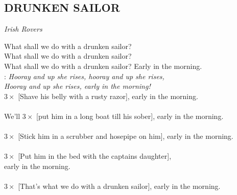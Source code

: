 \begin{flushleft}
	\section*{\Huge DRUNKEN SAILOR}
	\emph{Irish Rovers}
\end{flushleft}

What shall we do with a drunken sailor?\\
What shall we do with a drunken sailor?\\
What shall we do with a drunken sailor? Early  in the morning.\\

\textregistered:
\emph{Hooray and up she rises, hooray and up she rises,\\
Hooray and up she rises, early in the morning!}\\

$3\times$ [Shave his belly with a rusty razor], early in the morning.\\

\textregistered\\

We'll $3\times$ [put him in a long boat till his sober], early in the morning.\\

\textregistered\\

$3\times$ [Stick him in a scrubber and hosepipe on him], early in the morning.\\

\textregistered\\

$3\times$ [Put him in the bed with the captains daughter],\\
early in the morning.\\

\textregistered\\

$3\times$ [That’s what we do with a drunken sailor], early in the morning.\\

\textregistered \textregistered

\newpage
